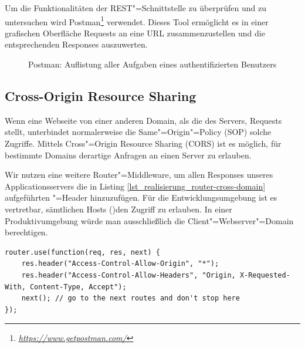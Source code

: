 Um die Funktionalitäten der REST"=Schnittstelle zu überprüfen und zu untersuchen wird Postman\footnote{\textit{\url{https://www.getpostman.com/}}} verwendet. Dieses Tool ermöglicht es in einer grafischen Oberfläche Requests an eine URL zusammenzustellen und die entsprechenden Responses auszuwerten. \\

\begin{figure}[htp] 
\caption{Postman: \glqq Auflistung aller Aufgaben eines authentifizierten Benutzers\grqq}
\label{image_implementierung_postman}
\end{figure} 

\newpage
\subsection{Cross-Origin Resource Sharing}

Wenn eine Webseite von einer anderen Domain, als die des Servers, Requests stellt, unterbindet normalerweise die Same"=Origin"=Policy (SOP) solche Zugriffe. Mittels Cross"=Origin Resource Sharing (CORS) ist es möglich, für bestimmte Domains derartige Anfragen an einen Server zu erlauben. 

Wir nutzen eine weitere Router"=Middleware, um allen Responses unseres Applicationsservers die in Listing \ref{lst_realisierung_router-cross-domain} aufgeführten "=Header hinzuzufügen. Für die Entwicklungsumgebung ist es vertretbar, sämtlichen Hosts (\code{(*)})den Zugriff zu erlauben. In einer Produktivumgebung würde man ausschließlich die Client"=Webserver"=Domain berechtigen. \\

\begin{lstlisting}[caption={Router-Middleware um jedem Response die \code{Access-Control}-Header hinzuzufügen},label={lst_realisierung_router-cross-domain}, frame=single]
router.use(function(req, res, next) {
    res.header("Access-Control-Allow-Origin", "*");
    res.header("Access-Control-Allow-Headers", "Origin, X-Requested-With, Content-Type, Accept");
    next(); // go to the next routes and don't stop here
});
\end{lstlisting}
\newpage
